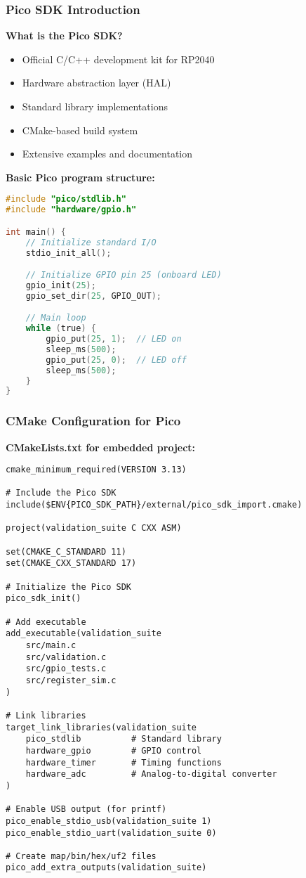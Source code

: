 \documentclass{beamer}
\begin{document}
\begin{frame}[fragile]
\frametitle{Pico SDK Introduction}
\textbf{What is the Pico SDK?}
\begin{itemize}
    \item Official C/C++ development kit for RP2040
    \item Hardware abstraction layer (HAL)
    \item Standard library implementations
    \item CMake-based build system
    \item Extensive examples and documentation
\end{itemize}

\textbf{Basic Pico program structure:}
\begin{lstlisting}[language=C]
#include "pico/stdlib.h"
#include "hardware/gpio.h"

int main() {
    // Initialize standard I/O
    stdio_init_all();

    // Initialize GPIO pin 25 (onboard LED)
    gpio_init(25);
    gpio_set_dir(25, GPIO_OUT);

    // Main loop
    while (true) {
        gpio_put(25, 1);  // LED on
        sleep_ms(500);
        gpio_put(25, 0);  // LED off
        sleep_ms(500);
    }
}
\end{lstlisting}
\end{frame}

\begin{frame}[fragile]
\frametitle{CMake Configuration for Pico}
\textbf{CMakeLists.txt for embedded project:}
\begin{lstlisting}[basicstyle=\tiny]
cmake_minimum_required(VERSION 3.13)

# Include the Pico SDK
include($ENV{PICO_SDK_PATH}/external/pico_sdk_import.cmake)

project(validation_suite C CXX ASM)

set(CMAKE_C_STANDARD 11)
set(CMAKE_CXX_STANDARD 17)

# Initialize the Pico SDK
pico_sdk_init()

# Add executable
add_executable(validation_suite
    src/main.c
    src/validation.c
    src/gpio_tests.c
    src/register_sim.c
)

# Link libraries
target_link_libraries(validation_suite
    pico_stdlib          # Standard library
    hardware_gpio        # GPIO control
    hardware_timer       # Timing functions
    hardware_adc         # Analog-to-digital converter
)

# Enable USB output (for printf)
pico_enable_stdio_usb(validation_suite 1)
pico_enable_stdio_uart(validation_suite 0)

# Create map/bin/hex/uf2 files
pico_add_extra_outputs(validation_suite)
\end{lstlisting}
\end{frame}
\end{document}
